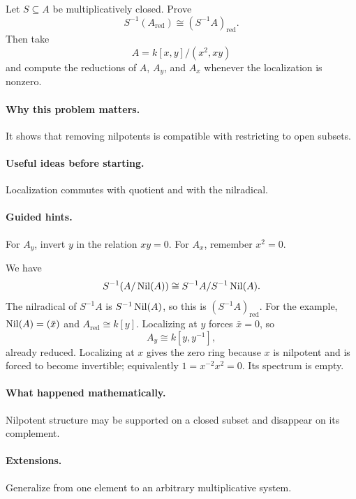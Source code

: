 \begin{problem}
Let $S\subseteq A$ be multiplicatively closed.  Prove
\[
S^{-1}(A_{\mathrm{red}})\cong(S^{-1}A)_{\mathrm{red}}.
\]
Then take
\[
A=k[x,y]/(x^2,xy)
\]
and compute the reductions of $A$, $A_y$, and $A_x$ whenever the localization is nonzero.
\end{problem}
\paragraph{Why this problem matters.}
It shows that removing nilpotents is compatible with restricting to open subsets.
\paragraph{Useful ideas before starting.}
Localization commutes with quotient and with the nilradical.
\paragraph{Guided hints.}
For $A_y$, invert $y$ in the relation $xy=0$.  For $A_x$, remember $x^2=0$.
\begin{solution}
We have
\[
S^{-1}(A/\operatorname{Nil}(A))\cong S^{-1}A/S^{-1}\operatorname{Nil}(A).
\]
The nilradical of $S^{-1}A$ is $S^{-1}\operatorname{Nil}(A)$, so this is $(S^{-1}A)_{\mathrm{red}}$.
For the example, $\operatorname{Nil}(A)=(\bar x)$ and $A_{\mathrm{red}}\cong k[y]$.
Localizing at $y$ forces $\bar x=0$, so
\[
A_y\cong k[y,y^{-1}],
\]
already reduced.  Localizing at $x$ gives the zero ring because $x$ is nilpotent and is
forced to become invertible; equivalently $1=x^{-2}x^2=0$.  Its spectrum is empty.
\end{solution}
\paragraph{What happened mathematically.}
Nilpotent structure may be supported on a closed subset and disappear on its complement.
\paragraph{Extensions.}
Generalize from one element to an arbitrary multiplicative system.
